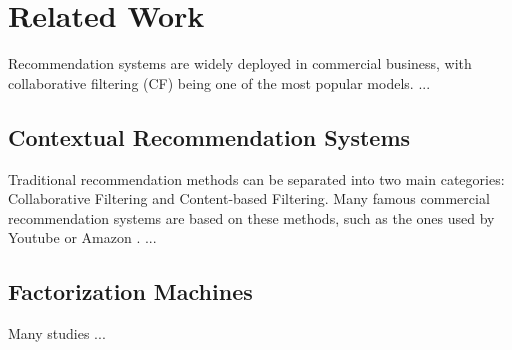 \chapter{Related Work}
Recommendation systems are widely deployed in commercial business, with collaborative
filtering (CF) being one of the most popular models. ... 

\section{Contextual Recommendation Systems}
Traditional recommendation methods can be separated into two main categories:
Collaborative Filtering and Content-based Filtering. Many famous commercial
recommendation systems are based on these methods, such as the ones used
by Youtube or Amazon \cite{libfm}. ...

\section{Factorization Machines}
Many studies ...
